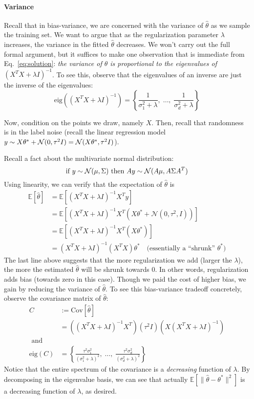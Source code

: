 \documentclass{article}
\newcommand{\E}{\mathbb{E}}
\begin{document}
\paragraph*{Variance}
Recall that in bias-variance, we are concerned with the variance of
$\hat{\theta}$ as we sample the training set. We want to argue that as the
regularization parameter $\lambda$ increases, the variance in the
fitted $\hat{\theta}$ decreases. We won't carry out the full formal
argument, but it suffices to make one observation that is immediate
from Eq.~\ref{eq:solution}: {\em the variance of $\hat{\theta}$ is
  proportional to the eigenvalues of $(X^TX + \lambda
  I)^{-1}$}. To see this, observe that the eigenvalues of an inverse are just the inverse
of the eigenvalues:
\[ \mathrm{eig}\left( \left(X^TX + \lambda I \right) ^{-1} \right) = \left\{ \frac{1}{\sigma_1^2+ \lambda}, \; \dots, \;\frac{1}{\sigma_d^2 + \lambda} \right\} \]

Now, condition on the points we draw, namely $X$. Then, recall that
randomness is in the label noise (recall the linear regression model
$y \sim X\theta^* + {\cal N}(0, \tau^2 I) = {\cal N}(X\theta^*, \tau^2I)$). 

Recall a fact about the multivariate normal distribution:
\[ \text{if } y \sim {\cal N}(\mu, \Sigma) \textrm{ then } Ay \sim {\cal N}(A\mu, A\Sigma A^T)\]
Using linearity, we can verify that the expectation of $\hat{\theta}$ is
\begin{align*}
\E[\hat{\theta}] &= \E[(X^TX + \lambda I)^{-1} X^T y] \\
&=\E[(X^TX + \lambda I)^{-1} X^T (X\theta^* + \mathcal{N}(0,\tau^2, I))] \\
&=\E[(X^TX + \lambda I)^{-1} X^T (X\theta^*)] \\
&= (X^TX + \lambda I)^{-1} (X^T X) \theta^* \quad \text{(essentially a ``shrunk'' $\theta^*$)}
\end{align*}
The last line above suggests that the more regularization we add (larger the $\lambda$), the more
the estimated $\hat{\theta}$ will be shrunk towards 0. In other words, regularization adds bias (towards zero in this case).
Though we paid the cost of higher bias, we gain by reducing the variance of $\hat{\theta}$. To see this bias-variance tradeoff concretely, observe the covariance matrix of $\hat{\theta}$:
\begin{align*}
 C &:= \text{Cov}[\hat{\theta}] \\
&= \left((X^TX + \lambda I)^{-1}X^T\right)(\tau^2I)\left(X(X^TX + \lambda I)^{-1}\right)\\
 \text{ and } \\
 \mathrm{eig}(C) &= \left\{\frac{\tau^2\sigma_1^2}{(\sigma_1^2 + \lambda)^2}, \; \dots, \; \frac{\tau^2\sigma_d^2}{(\sigma_d^2 + \lambda)^2}  \right\}
\end{align*}
Notice that the entire spectrum of the covariance is a {\em
  decreasing} function of $\lambda$. By decomposing in the eigenvalue
basis, we can see that actually $\E[ \|\hat{\theta} - \theta^*\|^2 ]$ is a
decreasing function of $\lambda$, as desired.
\end{document}
